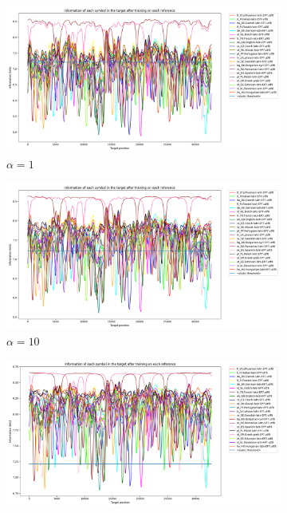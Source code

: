 \documentclass{article}
\begin{document}
\begin{figure}
    \begin{subfigure}[b]{0.3\textwidth}
        \begin{center}
            \includegraphics[width=1.0\linewidth]{../results/all_languages_random/-p_c:1:3.png}
        \end{center}
        \caption{$\alpha = 1$}
        \label{fig:all_languages_random_p_c:1:3_again}
    \end{subfigure}
    \hfill
    \begin{subfigure}[b]{0.3\textwidth}
        \begin{center}
            \includegraphics[width=1.0\linewidth]{../results/all_languages_random/-p_c:10:3.png}
        \end{center}
        \caption{$\alpha = 10$}
        \label{fig:all_languages_random_p_c:10:3}
    \end{subfigure}
    \hfill
    \begin{subfigure}[b]{0.3\textwidth}
        \begin{center}
            \includegraphics[width=1.0\linewidth]{../results/all_languages_random/-p_c:100:3.png}

\end{center}
\end{subfigure}
\end{figure}
\end{document}
